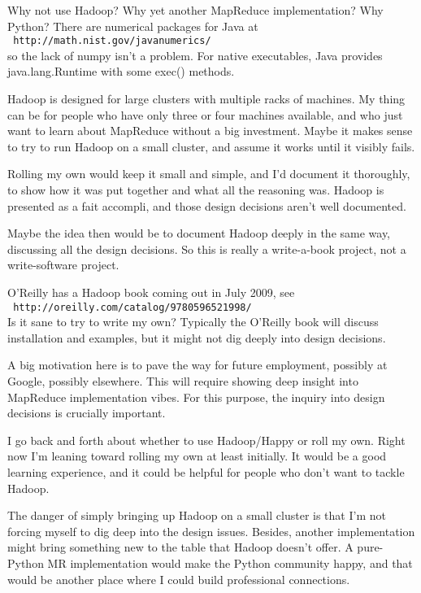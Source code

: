 \documentclass[11pt]{article}
\begin{document}
Why not use Hadoop? Why yet another MapReduce implementation? Why
Python? There are numerical packages for Java at \\ {\tt
http://math.nist.gov/javanumerics/} \\ so the lack of numpy isn't a
problem. For native executables, Java provides java.lang.Runtime with
some exec() methods.

Hadoop is designed for large clusters with multiple racks of machines.
My thing can be for people who have only three or four machines
available, and who just want to learn about MapReduce without a big
investment. Maybe it makes sense to try to run Hadoop on a small
cluster, and assume it works until it visibly fails.

Rolling my own would keep it small and simple, and I'd document it
thoroughly, to show how it was put together and what all the reasoning
was. Hadoop is presented as a fait accompli, and those design
decisions aren't well documented.

Maybe the idea then would be to document Hadoop deeply in the same
way, discussing all the design decisions. So this is really a
write-a-book project, not a write-software project.

O'Reilly has a Hadoop book coming out in July 2009, see \\ {\tt
  http://oreilly.com/catalog/9780596521998/} \\ Is it sane to try to
write my own? Typically the O'Reilly book will discuss installation
and examples, but it might not dig deeply into design decisions.

A big motivation here is to pave the way for future employment,
possibly at Google, possibly elsewhere. This will require showing deep
insight into MapReduce implementation vibes. For this purpose, the
inquiry into design decisions is crucially important.

I go back and forth about whether to use Hadoop/Happy or roll my own.
Right now I'm leaning toward rolling my own at least initially. It
would be a good learning experience, and it could be helpful for
people who don't want to tackle Hadoop.

The danger of simply bringing up Hadoop on a small cluster is that I'm
not forcing myself to dig deep into the design issues. Besides,
another implementation might bring something new to the table that
Hadoop doesn't offer. A pure-Python MR implementation would make the
Python community happy, and that would be another place where I could
build professional connections.
\end{document}
